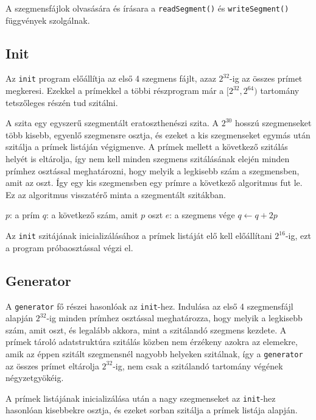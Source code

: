 A szegmensfájlok olvasására és írásara a \texttt{readSegment()} és \texttt{writeSegment()} függvények szolgálnak.

\subsection{Init}

Az \texttt{init} program előállítja az első 4 szegmens fájlt, azaz $2^{32}$-ig az összes prímet megkeresi.
Ezekkel a prímekkel a többi részprogram már a $[2^{32}, 2^{64})$ tartomány tetszőleges részén tud szitálni.

A szita egy egyszerű szegmentált eratoszthenészi szita.
A $2^{30}$ hosszú szegmenseket több kisebb, egyenlő szegmensre osztja, és ezeket a kis szegmenseket
egymás után szitálja a prímek listáján végigmenve.
A prímek mellett a következő szitálás helyét is eltárolja, így nem kell minden szegmens szitálásának elején minden prímhez osztással meghatározni, hogy melyik a legkisebb szám a szegmensben, amit az oszt.
Így egy kis szegmensben egy prímre a következő algoritmus fut le.
Ez az algoritmus visszatérő minta a szegmentált szitákban.

\begin{algorithmic}[1]
\State $p$: a prím
\State $q$: a következő szám, amit $p$ oszt
\State $e$: a szegmens vége
	\State {}
	\State $q \gets q + 2p$
\EndWhile
\end{algorithmic}

Az \texttt{init} szitájának inicializálásához a prímek listáját elő kell előállítani $2^{16}$-ig, ezt a program próbaosztással végzi el.

\subsection{Generator}

A \texttt{generator} fő részei hasonlóak az \texttt{init}-hez.
Indulása az első 4 szegmensfájl alapján $2^{32}$-ig minden prímhez osztással meghatározza, hogy melyik a legkisebb szám, amit oszt, és legalább akkora, mint a szitálandó szegmens kezdete.
A prímek tároló adatstruktúra szitálás közben nem érzékeny azokra az elemekre, amik az éppen szitált szegmensnél nagyobb helyeken szitálnak, így a \texttt{generator} az összes prímet eltárolja $2^{32}$-ig, nem csak a szitálandó tartomány végének négyzetgyökéig.

A prímek listájának inicializálása után a nagy szegmenseket az \texttt{init}-hez hasonlóan kisebbekre osztja, és ezeket sorban szitálja a prímek listája alapján.

